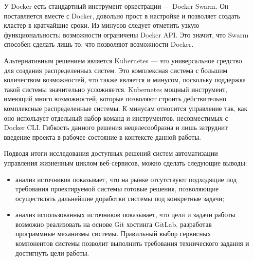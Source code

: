 У Docker есть стандартный инструмент оркестрации --- Docker Swarm.
Он поставляется вместе с Docker, довольно прост в настройке и позволяет создать кластер в кратчайшие сроки.
Из минусов следует отметить узкую функциональность: возможности ограничены Docker API.
Это значит, что Swarm способен сделать лишь то, что позволяют возможности Docker\cite{fasterDevOps}.

Альтернативным решением является Kubernetes --- это универсальное средство для создания распределенных систем.
Это комплексная система с большим количеством возможностей, что также является и минусом, поскольку поддержка такой системы значительно усложняется.
Kubernetes мощный инструмент, имеющий много возможностей, которые позволяют строить действительно комплексные распределенные системы.
К минусам относится управление так, как оно использует отдельный набор команд и инструментов, несовместимых с Docker CLI\cite{web:docker-kubernetes}.
Гибкость данного решения нецелесообразна и лишь затруднит введение проекта в рабочее состояние в контексте данной работы.

Подводя итоги исследования доступных решений систем автоматизации управления жизненным циклом веб-сервисов, можно сделать следующие выводы:
\begin{itemize}
    \item анализ источников показывает, что на рынке отсутствуют подходящие под требования проектируемой системы готовые решения,
    позволяющие осуществлять дальнейшие доработки системы под конкретные задачи;
    \item анализ использованных источников показывает, что цели и задачи работы возможно реализовать на основе Git хостинга GitLab,
    разработав программные механизмы системы.
    Правильный выбор сервисных компонентов системы позволит выполнить требования технического задания и достигнуть цели работы.
\end{itemize}

